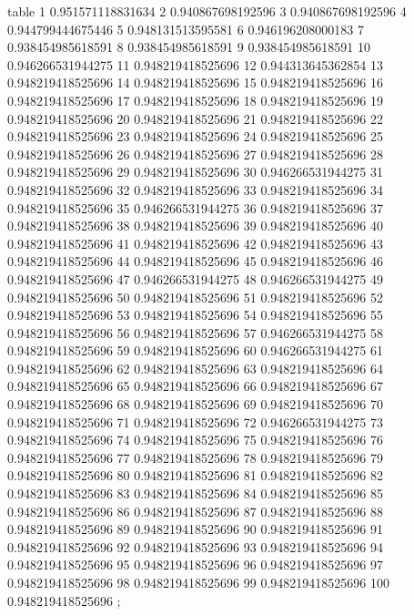 table {%
	1 0.951571118831634
	2 0.940867698192596
	3 0.940867698192596
	4 0.944799444675446
	5 0.948131513595581
	6 0.946196208000183
	7 0.938454985618591
	8 0.938454985618591
	9 0.938454985618591
	10 0.946266531944275
	11 0.948219418525696
	12 0.944313645362854
	13 0.948219418525696
	14 0.948219418525696
	15 0.948219418525696
	16 0.948219418525696
	17 0.948219418525696
	18 0.948219418525696
	19 0.948219418525696
	20 0.948219418525696
	21 0.948219418525696
	22 0.948219418525696
	23 0.948219418525696
	24 0.948219418525696
	25 0.948219418525696
	26 0.948219418525696
	27 0.948219418525696
	28 0.948219418525696
	29 0.948219418525696
	30 0.946266531944275
	31 0.948219418525696
	32 0.948219418525696
	33 0.948219418525696
	34 0.948219418525696
	35 0.946266531944275
	36 0.948219418525696
	37 0.948219418525696
	38 0.948219418525696
	39 0.948219418525696
	40 0.948219418525696
	41 0.948219418525696
	42 0.948219418525696
	43 0.948219418525696
	44 0.948219418525696
	45 0.948219418525696
	46 0.948219418525696
	47 0.946266531944275
	48 0.946266531944275
	49 0.948219418525696
	50 0.948219418525696
	51 0.948219418525696
	52 0.948219418525696
	53 0.948219418525696
	54 0.948219418525696
	55 0.948219418525696
	56 0.948219418525696
	57 0.946266531944275
	58 0.948219418525696
	59 0.948219418525696
	60 0.946266531944275
	61 0.948219418525696
	62 0.948219418525696
	63 0.948219418525696
	64 0.948219418525696
	65 0.948219418525696
	66 0.948219418525696
	67 0.948219418525696
	68 0.948219418525696
	69 0.948219418525696
	70 0.948219418525696
	71 0.948219418525696
	72 0.946266531944275
	73 0.948219418525696
	74 0.948219418525696
	75 0.948219418525696
	76 0.948219418525696
	77 0.948219418525696
	78 0.948219418525696
	79 0.948219418525696
	80 0.948219418525696
	81 0.948219418525696
	82 0.948219418525696
	83 0.948219418525696
	84 0.948219418525696
	85 0.948219418525696
	86 0.948219418525696
	87 0.948219418525696
	88 0.948219418525696
	89 0.948219418525696
	90 0.948219418525696
	91 0.948219418525696
	92 0.948219418525696
	93 0.948219418525696
	94 0.948219418525696
	95 0.948219418525696
	96 0.948219418525696
	97 0.948219418525696
	98 0.948219418525696
	99 0.948219418525696
	100 0.948219418525696
};
